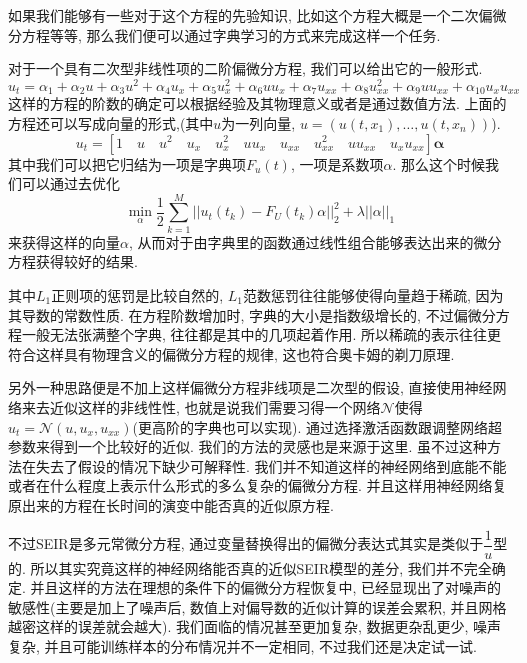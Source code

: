 \documentclass[lang=cn,11pt]{elegantpaper}
\begin{document}
如果我们能够有一些对于这个方程的先验知识, 比如这个方程大概是一个二次偏微分方程等等, 那么我们便可以通过字典学习的方式来完成这样一个任务.

对于一个具有二次型非线性项的二阶偏微分方程, 我们可以给出它的一般形式.
\large
\begin{equation}
	u_t=\alpha_1+\alpha_2u+\alpha_3u^2+\alpha_4u_x+\alpha_5u_x^2+\alpha_6uu_x+\alpha_7u_{xx}+\alpha_8u_{xx}^2+\alpha_9uu_{xx}+\alpha_{10}u_xu_{xx}
\end{equation}
\normalsize
这样的方程的阶数的确定可以根据经验及其物理意义或者是通过数值方法. 上面的方程还可以写成向量的形式,(其中$u$为一列向量, $u=(u(t,x_1), \dots, u(t,x_n))$).
\large
\begin{equation}
	u_t=[1\quad u\quad u^2\quad u_x\quad u_x^2\quad uu_x\quad u_{xx}\quad u_{xx}^2\quad uu_{xx}\quad u_xu_{xx}] \mathbf \alpha
\end{equation}
\normalsize
其中我们可以把它归结为一项是字典项$F_u(t)$, 一项是系数项$\alpha$. 那么这个时候我们可以通过去优化
\large
\begin{equation}
	\min_\alpha \dfrac{1}{2}\sum_{k=1}^M ||u_t(t_k)-F_U(t_k)\alpha||_2^2+\lambda||\alpha||_1
\end{equation}
\normalsize
来获得这样的向量$\alpha$, 从而对于由字典里的函数通过线性组合能够表达出来的微分方程获得较好的结果. 

其中$L_1$正则项的惩罚是比较自然的, $L_1$范数惩罚往往能够使得向量趋于稀疏, 因为其导数的常数性质. 在方程阶数增加时, 字典的大小是指数级增长的, 不过偏微分方程一般无法张满整个字典, 往往都是其中的几项起着作用. 所以稀疏的表示往往更符合这样具有物理含义的偏微分方程的规律, 这也符合奥卡姆的剃刀原理\cite{Schaeffer2017}.

另外一种思路便是不加上这样偏微分方程非线项是二次型的假设, 直接使用神经网络来去近似这样的非线性性, 也就是说我们需要习得一个网络$\mathcal N$使得$u_t=\mathcal N(u,u_x,u_{xx})$(更高阶的字典也可以实现). 通过选择激活函数跟调整网络超参数来得到一个比较好的近似. 我们的方法的灵感也是来源于这里. 虽不过这种方法在失去了假设的情况下缺少可解释性. 我们并不知道这样的神经网络到底能不能或者在什么程度上表示什么形式的多么复杂的偏微分方程. 并且这样用神经网络复原出来的方程在长时间的演变中能否真的近似原方程. 

不过SEIR是多元常微分方程, 通过变量替换得出的偏微分表达式其实是类似于$\dfrac{1}{u}$型的. 所以其实究竟这样的神经网络能否真的近似SEIR模型的差分, 我们并不完全确定. 并且这样的方法在理想的条件下的偏微分方程恢复中, 已经显现出了对噪声的敏感性(主要是加上了噪声后, 数值上对偏导数的近似计算的误差会累积\cite{long2019pde}, 并且网格越密这样的误差就会越大). 我们面临的情况甚至更加复杂, 数据更杂乱更少, 噪声复杂, 并且可能训练样本的分布情况并不一定相同, 不过我们还是决定试一试.
\end{document}
